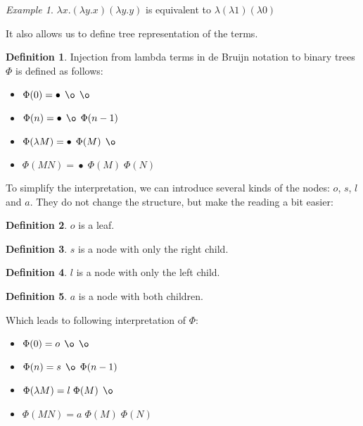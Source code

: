 \documentclass[final]{article}
\theoremstyle{definition}
\newtheorem{definition}{Definition}[subsection]
\theoremstyle{remark}
\newtheorem{example}{Example}[subsection]
\DeclareMathOperator{\n}{\bullet}
\DeclareMathOperator{\no}{\o}
\begin{document}
\begin{example}
    \(\lambda x . (\lambda y . x) (\lambda y . y)\) is equivalent to \(\lambda (\lambda 1) (\lambda 0)\)
\end{example}

It also allows us to define tree representation of the terms.

\begin{definition}
    Injection from lambda terms in de Bruijn notation to binary trees \(\Phi\) is defined as follows:
    \begin{itemize}
        \item \(\Phi(0) = \n\; \no\; \no\)
        \item \(\Phi(n) = \n\; \no\; \Phi(n - 1)\)
        \item \(\Phi(\lambda M) = \n\; \Phi(M)\; \no\)
        \item \(\Phi(M N) = \n\; \Phi(M)\; \Phi(N)\)
    \end{itemize}
\end{definition}

To simplify the interpretation, we can introduce several kinds of the nodes: \(o\), \(s\), \(l\) and \(a\). They do not change the structure, but make the reading a bit easier:

\begin{definition}
    \(o\) is a leaf.
\end{definition}

\begin{definition}
    \(s\) is a node with only the right child.
\end{definition}

\begin{definition}
    \(l\) is a node with only the left child.
\end{definition}

\begin{definition}
    \(a\) is a node with both children.
\end{definition}

Which leads to following interpretation of \(\Phi\):

\begin{itemize}
    \item \(\Phi(0) = o\; \no\; \no\)
    \item \(\Phi(n) = s\; \no\; \Phi(n - 1)\)
    \item \(\Phi(\lambda M) = l\; \Phi(M)\; \no\)
    \item \(\Phi(M N) = a\; \Phi(M)\; \Phi(N)\)
\end{itemize}
\end{document}
